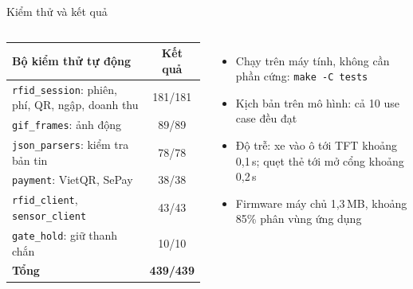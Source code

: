 \documentclass[aspectratio=169,11pt]{beamer}
\newcommand{\code}[1]{\texttt{#1}}
\newcommand{\gridtable}{\renewcommand{\arraystretch}{1.3}}
\begin{document}
\begin{frame}{Kiểm thử và kết quả}
\begin{columns}[T]
\scriptsize\gridtable
\begin{tabularx}{\linewidth}{|X|c|}
\hline
\textbf{Bộ kiểm thử tự động} & \textbf{Kết quả} \\ \hline
\code{rfid\_session}: phiên, phí, QR, ngập, doanh thu & 181/181 \\ \hline
\code{gif\_frames}: ảnh động & 89/89 \\ \hline
\code{json\_parsers}: kiểm tra bản tin & 78/78 \\ \hline
\code{payment}: VietQR, SePay & 38/38 \\ \hline
\code{rfid\_client}, \code{sensor\_client} & 43/43 \\ \hline
\code{gate\_hold}: giữ thanh chắn & 10/10 \\ \hline
\textbf{Tổng} & \textbf{439/439} \\ \hline
\end{tabularx}
\small
\begin{itemize}
  \item Chạy trên máy tính, không cần phần cứng: \code{make -C tests}
  \item Kịch bản trên mô hình: cả 10 use case đều đạt
  \item Độ trễ: xe vào ô tới TFT khoảng 0,1\,s; quẹt thẻ tới mở cổng khoảng 0,2\,s
  \item Firmware máy chủ 1,3\,MB, khoảng 85\% phân vùng ứng dụng
\end{itemize}
\end{columns}
\end{frame}
\end{document}
